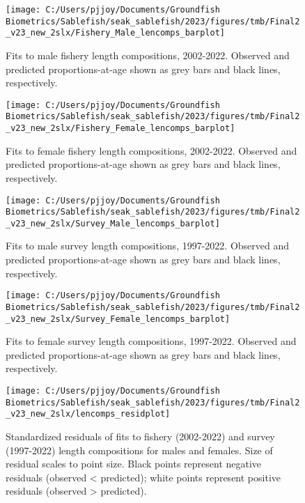 \documentclass[
]{article}
\begin{document}
\begin{figure}[H]
\texttt{[image: C:/Users/pjjoy/Documents/Groundfish Biometrics/Sablefish/seak\_sablefish/2023/figures/tmb/Final2\_v23\_new\_2slx/Fishery\_Male\_lencomps\_barplot]} \caption{Fits to male fishery length compositions, 2002-2022. Observed and predicted proportions-at-age shown as grey bars and black lines, respectively.}\label{fig:malefshlen}
\end{figure}

\begin{figure}[H]
\texttt{[image: C:/Users/pjjoy/Documents/Groundfish Biometrics/Sablefish/seak\_sablefish/2023/figures/tmb/Final2\_v23\_new\_2slx/Fishery\_Female\_lencomps\_barplot]} \caption{Fits to female fishery length compositions, 2002-2022. Observed and predicted proportions-at-age shown as grey bars and black lines, respectively.}\label{fig:femalefshlen}
\end{figure}

\begin{figure}[H]
\texttt{[image: C:/Users/pjjoy/Documents/Groundfish Biometrics/Sablefish/seak\_sablefish/2023/figures/tmb/Final2\_v23\_new\_2slx/Survey\_Male\_lencomps\_barplot]} \caption{Fits to male survey length compositions, 1997-2022. Observed and predicted proportions-at-age shown as grey bars and black lines, respectively.}\label{fig:malesrvlen}
\end{figure}

\begin{figure}[H]
\texttt{[image: C:/Users/pjjoy/Documents/Groundfish Biometrics/Sablefish/seak\_sablefish/2023/figures/tmb/Final2\_v23\_new\_2slx/Survey\_Female\_lencomps\_barplot]} \caption{Fits to female survey length compositions, 1997-2022. Observed and predicted proportions-at-age shown as grey bars and black lines, respectively.}\label{fig:femalesrvlen}
\end{figure}

\begin{figure}[H]
\texttt{[image: C:/Users/pjjoy/Documents/Groundfish Biometrics/Sablefish/seak\_sablefish/2023/figures/tmb/Final2\_v23\_new\_2slx/lencomps\_residplot]} \caption{Standardized residuals of fits to fishery (2002-2022) and survey (1997-2022) length compositions for males and females. Size of residual scales to point size. Black points represent negative residuals (observed < predicted); white points represent positive residuals (observed > predicted).}\label{fig:residlen}
\end{figure}
\end{document}
